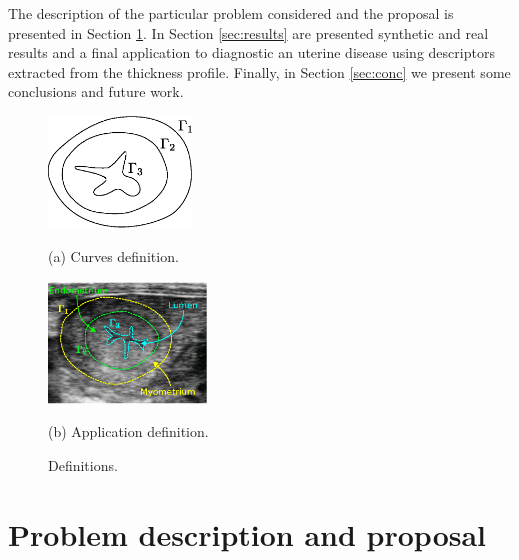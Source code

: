 \documentclass{article}
\begin{document}
The description of the particular problem considered and the proposal is presented in Section \ref{sec:proposal}. In Section \ref{sec:results} are presented synthetic and real results and a final application to diagnostic an uterine disease using descriptors extracted from the thickness profile. Finally, in Section \ref{sec:conc} we present some conclusions and future work.

\begin{figure}[t]
  \begin{minipage}[b]{.45\linewidth}
    \centering
    \centerline{\includegraphics[width=3.8cm]{pics/defs2}}
    \centerline{(a) Curves definition.}\medskip
  \end{minipage}\hfill
  \begin{minipage}[b]{.52\linewidth}
    \centering
    \centerline{\includegraphics[width=4.2cm]{pics/defsEndo}}
    \centerline{(b) Application definition.}\medskip
  \end{minipage}
  \caption{Definitions.}
  \label{fig:defs}
\end{figure}

\section{Problem description and proposal}
\label{sec:proposal}
\end{document}
